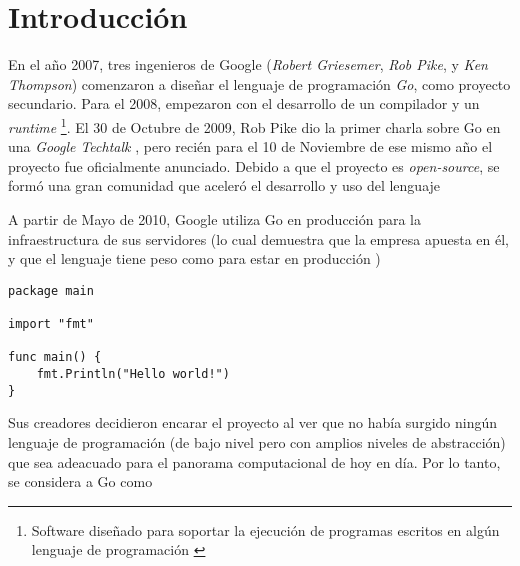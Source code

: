 







\clearpage
\tableofcontents
\clearpage 

\lstset{style=go}

\section{Introducción}

En el año 2007, tres ingenieros de Google (\emph{Robert Griesemer}, \emph{Rob Pike}, y \emph{Ken Thompson}) comenzaron a diseñar el lenguaje de programación \emph{Go}, como proyecto secundario. Para el 2008, empezaron con el desarrollo de un compilador y un \emph{runtime} \footnote{Software diseñado para soportar la ejecución de programas escritos en algún lenguaje de programación \autocite{Wikipedia:runtime}}. El 30 de Octubre de 2009, Rob Pike dio la primer charla sobre Go en una \emph{Google Techtalk} \autocite{TheGoProgrammingLanguage}, pero recién para el 10 de Noviembre de ese mismo año el proyecto fue oficialmente anunciado. Debido a que el proyecto es \emph{open-source}, se formó una gran comunidad que aceleró el desarrollo y uso del lenguaje 

A partir de Mayo de 2010, Google utiliza Go en producción para la infraestructura de sus servidores (lo cual demuestra que la empresa apuesta en él, y que el lenguaje tiene peso como para estar en producción \autocite{TheWayToGo:Origins})

\vspace*{10mm}
\begin{lstlisting}[title=\dq{Hola mundo} en Go]
package main

import "fmt"

func main() {
    fmt.Println("Hello world!")
}
\end{lstlisting}


Sus creadores decidieron encarar el proyecto al ver que no había surgido ningún lenguaje de programación (de bajo nivel pero con amplios niveles de abstracción) que sea adeacuado para el panorama computacional de hoy en día. Por lo tanto, se considera a Go como  \autocite{BookTheGoProgrammingLanguage:Preface} 

